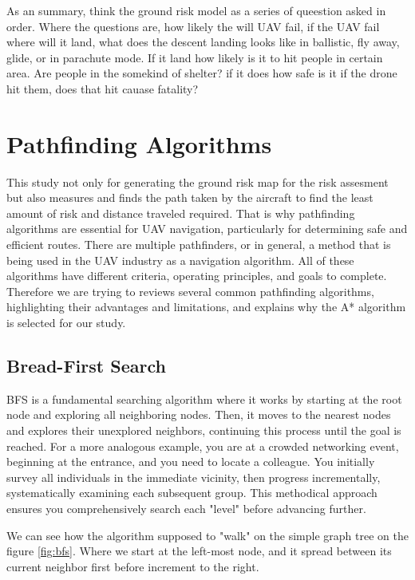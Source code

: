 \documentclass[12pt]{report}
\begin{document}
        As an summary, think the ground risk model as a series of queestion asked in order. Where the questions are, how
        likely the will UAV fail, if the UAV fail where will it land, what does the descent landing looks like in
        ballistic, fly away, glide, or in parachute mode. If it land how likely is it to hit people in certain area. Are
        people in the somekind of shelter? if it does how safe is it if the drone hit them, does that hit cauase
        fatality?
        
    \section{Pathfinding Algorithms}
        This study not only for generating the ground risk map for the risk assesment but also measures and finds the
        path taken by the aircraft to find the least amount of risk and distance traveled required. That is why
        pathfinding algorithms are essential for UAV navigation, particularly for determining safe and efficient routes.
        There are multiple pathfinders, or in general, a method that is being used in the UAV industry as a navigation
        algorithm. All of these algorithms have different criteria, operating principles, and goals to complete.
        Therefore we are trying to reviews several common pathfinding algorithms, highlighting their advantages and
        limitations, and explains why the A* algorithm is selected for our study.
        
        \subsection{Bread-First Search}
        \ac{BFS} is a fundamental searching algorithm where it works by starting at the root node and exploring all
        neighboring nodes. Then, it moves to the nearest nodes and explores their unexplored neighbors, continuing this
        process until the goal is reached. For a more analogous example, you are at a crowded networking event,
        beginning at the entrance, and you need to locate a colleague. You initially survey all individuals in the
        immediate vicinity, then progress incrementally, systematically examining each subsequent group. This methodical
        approach ensures you comprehensively search each "level" before advancing further.

        We can see how the algorithm supposed to "walk" on the simple graph tree on the figure \ref{fig:bfs}. Where we
        start at the left-most node, and it spread between its current neighbor first before increment to the right.
\end{document}
